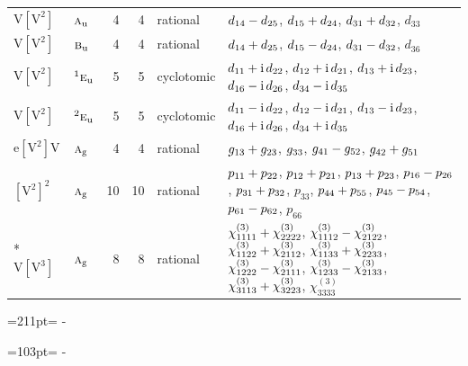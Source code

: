 \documentclass[10pt,a4paper]{article}
\newcommand{\needspace}[1]{\par\penalty-100\begingroup\dimen0=#1\relax\dimen2=\pagegoal
  \advance\dimen2-\pagetotal\ifdim\dimen0>\dimen2\relax\ifdim\dimen2>0pt\vfil\break\fi\fi
  \endgroup}
\numberwithin{equation}{section}
\newcommand{\irr}[1]{\text{\normalfont\scshape #1}}
\newcommand{\conjpair}[1]{{}^{#1}}
\newcommand{\ptag}[1]{\mathrm{#1}}
\newcommand{\iunit}{\mathrm{i}}
\newcommand{\jahn}[1]{\mathrm{#1}}
\newlength{\fillwidth}\newlength{\cellwidth}\newlength{\colwidth}
\newcommand{\signbreak}{\penalty100\relax}
\begin{document}
{\begin{longtable}{@{}llrrl>{\RaggedRight\arraybackslash}p{\fillwidth}@{}}
$\jahn{V[V^{2}]}$ & $\irr{a}_{\ptag{u}}$ & 4 & 4 & rational & $d_{14} -\signbreak d_{25}$, $d_{15} +\signbreak d_{24}$, $d_{31} +\signbreak d_{32}$, $d_{33}$\\
$\jahn{V[V^{2}]}$ & $\irr{b}_{\ptag{u}}$ & 4 & 4 & rational & $d_{14} +\signbreak d_{25}$, $d_{15} -\signbreak d_{24}$, $d_{31} -\signbreak d_{32}$, $d_{36}$\\
$\jahn{V[V^{2}]}$ & $\conjpair{1}\irr{e}_{\ptag{u}}$ & 5 & 5 & cyclotomic & $d_{11} +\signbreak \iunit{}\,d_{22}$, $d_{12} +\signbreak \iunit{}\,d_{21}$, $d_{13} +\signbreak \iunit{}\,d_{23}$, $d_{16} -\signbreak \iunit{}\,d_{26}$, $d_{34} -\signbreak \iunit{}\,d_{35}$\\
$\jahn{V[V^{2}]}$ & $\conjpair{2}\irr{e}_{\ptag{u}}$ & 5 & 5 & cyclotomic & $d_{11} -\signbreak \iunit{}\,d_{22}$, $d_{12} -\signbreak \iunit{}\,d_{21}$, $d_{13} -\signbreak \iunit{}\,d_{23}$, $d_{16} +\signbreak \iunit{}\,d_{26}$, $d_{34} +\signbreak \iunit{}\,d_{35}$\\
$\jahn{e[V^{2}]V}$ & $\irr{a}_{\ptag{g}}$ & 4 & 4 & rational & $\mathnormal{g}_{13} +\signbreak \mathnormal{g}_{23}$, $\mathnormal{g}_{33}$, $\mathnormal{g}_{41} -\signbreak \mathnormal{g}_{52}$, $\mathnormal{g}_{42} +\signbreak \mathnormal{g}_{51}$\\
$\jahn{[V^{2}]^{2}}$ & $\irr{a}_{\ptag{g}}$ & 10 & 10 & rational & $p_{11} +\signbreak p_{22}$, $p_{12} +\signbreak p_{21}$, $p_{13} +\signbreak p_{23}$, $p_{16} -\signbreak p_{26}$, $p_{31} +\signbreak p_{32}$, $p_{33}$, $p_{44} +\signbreak p_{55}$, $p_{45} -\signbreak p_{54}$, $p_{61} -\signbreak p_{62}$, $p_{66}$\\*
$\jahn{V[V^{3}]}$ & $\irr{a}_{\ptag{g}}$ & 8 & 8 & rational & $\chi^{(3)}_{1111} +\signbreak \chi^{(3)}_{2222}$, $\chi^{(3)}_{1112} -\signbreak \chi^{(3)}_{2122}$, $\chi^{(3)}_{1122} +\signbreak \chi^{(3)}_{2112}$, $\chi^{(3)}_{1133} +\signbreak \chi^{(3)}_{2233}$, $\chi^{(3)}_{1222} -\signbreak \chi^{(3)}_{2111}$, $\chi^{(3)}_{1233} -\signbreak \chi^{(3)}_{2133}$, $\chi^{(3)}_{3113} +\signbreak \chi^{(3)}_{3223}$, $\chi^{(3)}_{3333}$\\
\bottomrule\end{longtable}}
\needspace{211pt}
\needspace{103pt}
\end{document}
